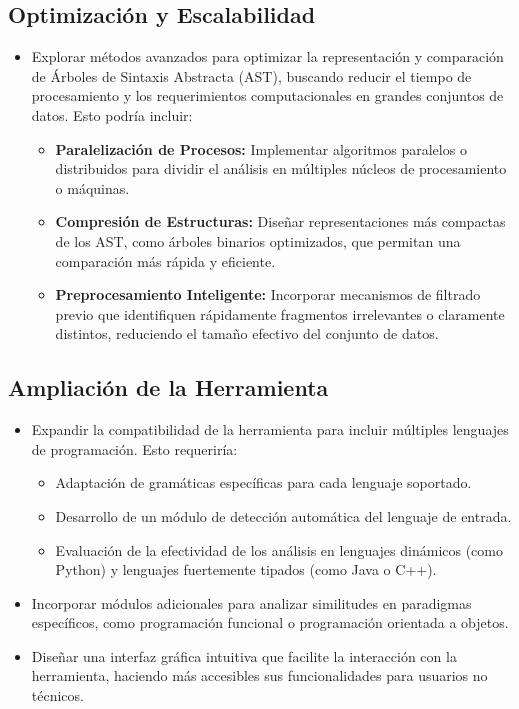 \begin{recomendations}

\subsection*{Optimización y Escalabilidad}
\begin{itemize}
    \item Explorar métodos avanzados para optimizar la representación y comparación de Árboles de Sintaxis Abstracta (AST), buscando reducir el tiempo de procesamiento y los requerimientos computacionales en grandes conjuntos de datos. Esto podría incluir:
    \begin{itemize}
        \item \textbf{Paralelización de Procesos:} Implementar algoritmos paralelos o distribuidos para dividir el análisis en múltiples núcleos de procesamiento o máquinas.
        \item \textbf{Compresión de Estructuras:} Diseñar representaciones más compactas de los AST, como árboles binarios optimizados, que permitan una comparación más rápida y eficiente.
        \item \textbf{Preprocesamiento Inteligente:} Incorporar mecanismos de filtrado previo que identifiquen rápidamente fragmentos irrelevantes o claramente distintos, reduciendo el tamaño efectivo del conjunto de datos.
    \end{itemize}
\end{itemize}

\subsection*{Ampliación de la Herramienta}
\begin{itemize}
    \item Expandir la compatibilidad de la herramienta para incluir múltiples lenguajes de programación. Esto requeriría:
    \begin{itemize}
        \item Adaptación de gramáticas específicas para cada lenguaje soportado.
        \item Desarrollo de un módulo de detección automática del lenguaje de entrada.
        \item Evaluación de la efectividad de los análisis en lenguajes dinámicos (como Python) y lenguajes fuertemente tipados (como Java o C++).
    \end{itemize}
    \item Incorporar módulos adicionales para analizar similitudes en paradigmas específicos, como programación funcional o programación orientada a objetos.
    \item Diseñar una interfaz gráfica intuitiva que facilite la interacción con la herramienta, haciendo más accesibles sus funcionalidades para usuarios no técnicos.
\end{itemize}


\end{recomendations}
